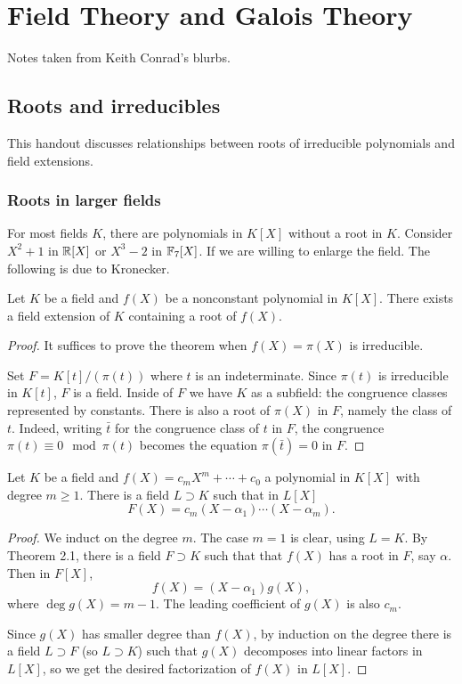 \section{Field Theory and Galois Theory}
Notes taken from Keith Conrad's blurbs.

\subsection{Roots and irreducibles}
This handout discusses relationships between roots of irreducible
polynomials and field extensions.
\subsubsection{Roots in larger fields}
For most fields $K$, there are polynomials in $K[X]$ without a root in
$K$. Consider $X^2+1$ in $\mathbb{R}[X]$ or $X^3-2$ in $\mathbb{F}_7[X]$. If we are
willing to enlarge the field. The following is due to Kronecker.
\begin{theorem}
  Let $K$ be a field and $f(X)$ be a nonconstant polynomial in
  $K[X]$. There exists a field extension of $K$ containing a root of
  $f(X)$.
\end{theorem}
\begin{proof}
  It suffices to prove the theorem when $f(X)=\pi(X)$ is irreducible.

  Set $F=K[t]/(\pi(t))$ where $t$ is an indeterminate. Since $\pi(t)$ is
  irreducible in $K[t]$, $F$ is a field. Inside of $F$ we have $K$ as a
  subfield: the congruence classes represented by constants. There is also
  a root of $\pi(X)$ in $F$, namely the class of $t$. Indeed, writing $\bar
  t$ for the congruence class of $t$ in $F$, the congruence $\pi(t)\equiv
  0\mod \pi(t)$ becomes the equation $\pi(\bar t)=0$ in $F$.
\end{proof}

\begin{corollary}
  Let $K$ be a field and $f(X)=c_mX^m+\cdots+c_0$ a polynomial in $K[X]$
  with degree $m\geq 1$. There is a field $L\supset K$ such that in $L[X]$
  \[
    F(X)=c_m(X-\alpha_1)\cdots(X-\alpha_m).
  \]
\end{corollary}
\begin{proof}
  We induct on the degree $m$. The case $m=1$ is clear, using $L=K$. By
  Theorem 2.1, there is a field $F\supset K$ such that that $f(X)$ has a
  root in $F$, say $\alpha$. Then in $F[X]$,
  \[
    f(X)=(X-\alpha_1)g(X),
  \]
  where $\deg g(X)=m-1$. The leading coefficient of $g(X)$ is also $c_m$.

  Since $g(X)$ has smaller degree than $f(X)$, by induction on the degree
  there is a field $L\supset F$ (so $L\supset K$) such that $g(X)$
  decomposes into linear factors in $L[X]$, so we get the desired
  factorization of $f(X)$ in $L[X]$.
\end{proof}



